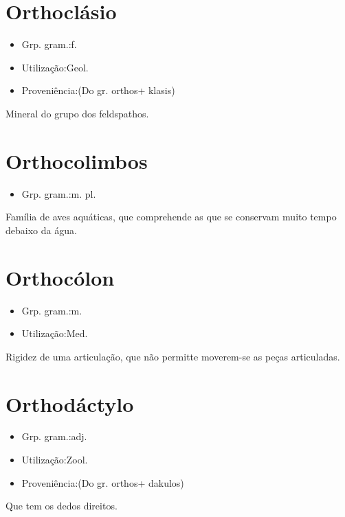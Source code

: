 \section{Orthoclásio}
\begin{itemize}
\item {Grp. gram.:f.}
\end{itemize}
\begin{itemize}
\item {Utilização:Geol.}
\end{itemize}
\begin{itemize}
\item {Proveniência:(Do gr. \textunderscore orthos\textunderscore  + \textunderscore klasis\textunderscore )}
\end{itemize}
Mineral do grupo dos feldspathos.
\section{Orthocolimbos}
\begin{itemize}
\item {Grp. gram.:m. pl.}
\end{itemize}
Família de aves aquáticas, que comprehende as que se conservam muito tempo debaixo da água.
\section{Orthocólon}
\begin{itemize}
\item {Grp. gram.:m.}
\end{itemize}
\begin{itemize}
\item {Utilização:Med.}
\end{itemize}
Rigidez de uma articulação, que não permitte moverem-se as peças articuladas.
\section{Orthodáctylo}
\begin{itemize}
\item {Grp. gram.:adj.}
\end{itemize}
\begin{itemize}
\item {Utilização:Zool.}
\end{itemize}
\begin{itemize}
\item {Proveniência:(Do gr. \textunderscore orthos\textunderscore  + \textunderscore dakulos\textunderscore )}
\end{itemize}
Que tem os dedos direitos.
